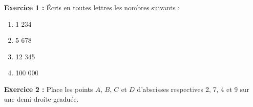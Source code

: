 \begin{exercisebox}
\textbf{Exercice 1 :} Écris en toutes lettres les nombres suivants :
\begin{enumerate}
	\item 1 234
	\item 5 678
	\item 12 345
	\item 100 000
\end{enumerate}

\textbf{Exercice 2 :} Place les points $A$, $B$, $C$ et $D$ d'abscisses respectives 2, 7, 4 et 9 sur une demi-droite graduée.


\end{exercisebox}



